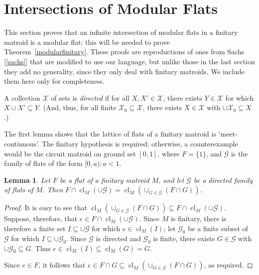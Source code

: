 \documentclass{amsart}
\theoremstyle{plain}
\newtheorem{lemma}[theorem]{Lemma}
\theoremstyle{definition}
\newcommand{\cG}{\mathcal{G}}
\newcommand{\cX}{\mathcal{X}}
\DeclareMathOperator{\cl}{cl}
\renewcommand{\ss}{\subseteq}
\begin{document}
\section{Intersections of Modular Flats}

This section proves that an infinite intersection of modular flats in a finitary matroid is a modular flat; 
this will be needed to prove Theorem~\ref{modularfinitary}.
These proofs are reproductions of ones from Sachs [\ref{sachs}] 
that are modified to use our language, but unlike those in the last section
they add no generality, since they only deal with finitary matroids.
We include them here only for completeness.  

A collection $\cX$ of sets is \emph{directed} if for all $X,X' \in \cX$, 
there exists $Y \in \cX$ for which $X \cup X' \ss Y$. 
(And, thus, for all finite $\cX_0 \ss \cX$, there exists $X \in \cX$ with 
$\cup \cX_0 \ss X$.)



The first lemma shows that the lattice of flats of a finitary matroid is `meet-continuous'. 
The finitary hypothesis is required; otherwise, a counterexample would be the
circuit matroid on ground set $[0,1]$, where $F = \{1\}$, and $\cG$ is the family
of flats of the form $[0,a) : a < 1$. 

\begin{lemma}\label{interclosuredirected}
  Let $F$ be a flat of a finitary matroid $M$, and let $\cG$ be a directed family 
  of flats of $M$. Then $F \cap \cl_M(\cup \cG) = \cl_M(\cup_{G \in \cG} (F \cap G))$. 
\end{lemma}
\begin{proof}
  It is easy to see that $\cl_M(\cup_{G \in \cG}(F \cap G)) \ss F \cap \cl_M(\cup \cG)$. 
  Suppose, therefore, that $e \in F \cap \cl_M(\cup \cG)$. 
  Since $M$ is finitary, there is therefore a finite set $I \ss \cup \cG$ 
  for which $e \in \cl_M(I)$; 
  let $\cG_0$ be a finite subset of $\cG$ for which $I \ss \cup \cG_0$. 
  Since $\cG$ is directed and $\cG_0$ is finite, there exists $G \in \cG$ with 
  $\cup \cG_0 \ss G$. Thus $e \in \cl_M(I) \ss \cl_M(G) = G$. 

  Since $e \in F$, it follows that $e \in F \cap G \ss \cl_M(\cup_{G \in \cG}(F \cap G))$, 
  as required. 
\end{proof}
\end{document}
